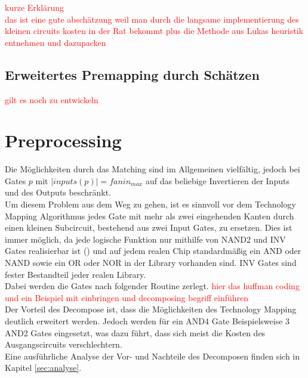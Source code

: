 \documentclass[11pt, a4paper, german]{article}
\newcommand{\TM}{Technology  Mapping }
\begin{document}
 \textcolor{red}{kurze Erklärung}\\
 
 \textcolor{red}{das ist eine gute abschätzung weil man durch die langsame implementierung des kleinen circuits kosten in der Rat bekommt plus die Methode aus Lukas heuristik entnehmen und dazupacken}


\subsection{Erweitertes Premapping durch Schätzen}
\label{subsec:erweitertes_premapping_durch_schaetzen}
\textcolor{red}{gilt es noch zu entwickeln} 

\section{Preprocessing}
Die Möglichkeiten durch das Matching sind im Allgemeinen vielfältig, jedoch bei Gates $p$ mit $|inputs(p)| = fanin_{max}$ auf das beliebige Invertieren der Inputs und des Outputs beschränkt. \\
Um diesem Problem aus dem Weg zu gehen, ist es sinnvoll vor dem \TM Algorithmus jedes Gate mit mehr als zwei eingehenden Kanten durch einen kleinen Subcircuit, bestehend aus zwei Input Gates, zu ersetzen. Dies ist immer möglich, da jede logische Funktion nur mithilfe von NAND2 und INV Gates realisierbar ist (\cite{Post}) und auf jedem realen Chip standardmäßig ein AND oder NAND sowie ein OR oder NOR in der Library vorhanden sind. INV Gates sind fester Bestandteil jeder realen Library.\\
Dabei werden die Gates nach folgender Routine zerlegt. \textcolor{red}{hier das huffman coding und ein Beispiel mit einbringen und decomposing begriff einführen}\\
Der Vorteil des Decompose ist, dass die Möglichkeiten des \TM deutlich erweitert werden. Jedoch werden für ein AND4 Gate Beispielsweise 3 AND2 Gates eingesetzt, was dazu führt, dass sich meist die Kosten des Ausgangscircuits verschlechtern.\\
Eine ausführliche Analyse der Vor- und Nachteile des Decomposen finden sich in Kapitel \ref{sec:analyse}.
	
\end{document}
